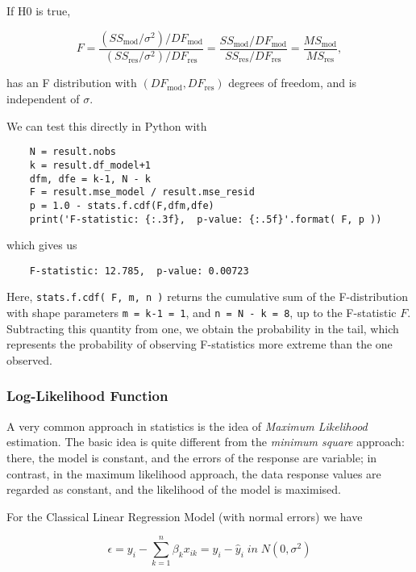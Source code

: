 If H0 is true,

\begin{equation}
  F = \frac{(SS_\text{mod}/\sigma^2)/DF_\text{mod}}{(SS_\text{res}/\sigma^2)/DF_\text{res}} = \frac{SS_\text{mod}/DF_\text{mod}}{SS_\text{res}/DF_\text{res}} = \frac{MS_\text{mod}}{MS_\text{res}},
\end{equation}

has an F distribution with $(DF_\text{mod}, DF_\text{res})$ degrees of freedom, and is independent of $\sigma$.

We can test this directly in Python with

\begin{lstlisting}
    N = result.nobs
    k = result.df_model+1
    dfm, dfe = k-1, N - k
    F = result.mse_model / result.mse_resid
    p = 1.0 - stats.f.cdf(F,dfm,dfe)
    print('F-statistic: {:.3f},  p-value: {:.5f}'.format( F, p ))
\end{lstlisting}

which gives us

\begin{lstlisting}
    F-statistic: 12.785,  p-value: 0.00723
\end{lstlisting}

Here, \lstinline{stats.f.cdf( F, m, n )} returns the cumulative sum of the F-distribution with shape parameters \lstinline{m = k-1 = 1}, and \lstinline{n = N - k = 8}, up to the F-statistic $F$. Subtracting this quantity from one, we obtain the probability in the tail, which represents the probability of observing F-statistics more extreme than the one observed.

\subsubsection{Log-Likelihood Function}

A very common approach in statistics is the idea of \emph{Maximum Likelihood} estimation.  The basic idea is quite different from the \emph{minimum square} approach: there, the model is constant, and the errors of the response are variable; in contrast, in the maximum likelihood approach, the data response values are regarded as constant, and the likelihood of the model is maximised.

For the Classical Linear Regression Model (with normal errors) we have

\begin{equation}
  \epsilon = y_i - \sum_{k=1}^n \beta_k x_{ik} = y_i - \hat{y}_i \; in \; N(0, \sigma^2)
\end{equation}


